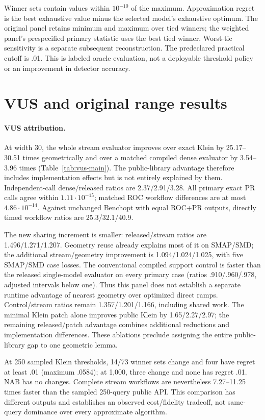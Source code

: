 Winner sets contain values within $10^{-10}$ of the maximum. Approximation
regret is the best exhaustive value minus the selected model's exhaustive
optimum. The original panel retains minimum and maximum over tied winners;
the weighted panel's prespecified primary statistic uses the best tied winner.
Worst-tie sensitivity is a separate subsequent reconstruction. The predeclared
practical cutoff is .01. This is labeled oracle evaluation, not a deployable
threshold policy or an improvement in detector accuracy.

\section{VUS and original range results}

\paragraph{VUS attribution.}
At width 30, the whole stream evaluator improves over exact Klein by
25.17--30.51 times geometrically and over a matched compiled dense evaluator
by 3.54--3.96 times (Table~\ref{tab:vus-main}). The public-library advantage
therefore includes implementation effects but is not entirely explained by
them. Independent-call dense/released ratios are 2.37/2.91/3.28. All primary
exact PR calls agree within $1.11\cdot10^{-15}$; matched ROC workflow differences
are at most $4.86\cdot10^{-14}$. Against unchanged Benchopt with equal ROC+PR
outputs, directly timed workflow ratios are 25.3/32.1/40.9.

The new sharing increment is smaller: released/stream ratios are
1.496/1.271/1.207. Geometry reuse already explains most of it on SMAP/SMD;
the additional stream/geometry improvement is 1.094/1.024/1.025, with five
SMAP/SMD case losses. The conventional compiled support control is faster than
the released single-model evaluator on every primary case (ratios
.910/.960/.978, adjusted intervals below one). Thus this panel does not
establish a separate runtime advantage of nearest geometry over optimized
direct ramps. Control/stream ratios remain 1.357/1.201/1.166, including shared
work. The minimal Klein patch alone improves public Klein by 1.65/2.27/2.97;
the remaining released/patch advantage combines additional reductions and
implementation differences. These ablations preclude assigning the entire
public-library gap to one geometric lemma.

At 250 sampled Klein thresholds, 14/73 winner sets change and four have regret
at least .01 (maximum .0584); at 1,000, three change and none has regret .01.
NAB has no changes. Complete stream workflows are nevertheless 7.27--11.25
times faster than the sampled 250-query public API. This comparison has
different outputs and establishes an observed cost/fidelity tradeoff, not
same-query dominance over every approximate algorithm.

